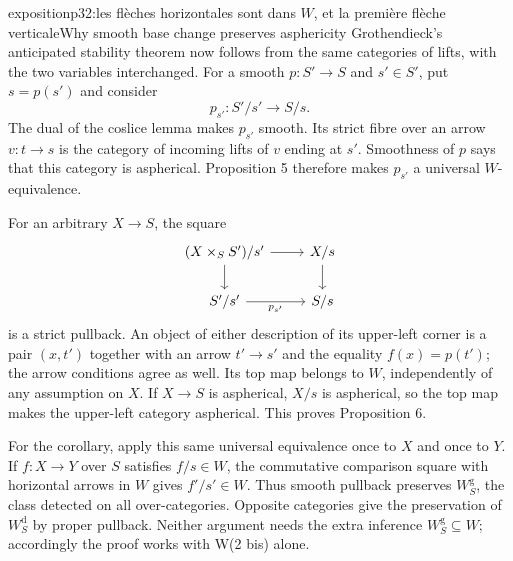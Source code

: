 \begin{dcomment}{exposition}{p32:les flèches horizontales sont dans $W$, et la première flèche verticale}{Why smooth base change preserves asphericity}
Grothendieck's anticipated stability theorem now follows from the same categories of lifts, with the two variables interchanged. For a smooth $p:S'\to S$ and $s'\in S'$, put $s=p(s')$ and consider
\[
 p_{s'}:S'/s'\longrightarrow S/s.
\]
The dual of the coslice lemma makes $p_{s'}$ smooth. Its strict fibre over an arrow $v:t\to s$ is the category of incoming lifts of $v$ ending at $s'$. Smoothness of $p$ says that this category is aspherical. Proposition 5 therefore makes $p_{s'}$ a universal $W$-equivalence.

For an arbitrary $X\to S$, the square
\[
\begin{tikzcd}
 (X\times_S S')/s'\ar[r]\ar[d]&X/s\ar[d]\\
 S'/s'\ar[r,"p_{s'}"']&S/s
\end{tikzcd}
\]
is a strict pullback. An object of either description of its upper-left corner is a pair $(x,t')$ together with an arrow $t'\to s'$ and the equality $f(x)=p(t')$; the arrow conditions agree as well. Its top map belongs to $W$, independently of any assumption on $X$. If $X\to S$ is aspherical, $X/s$ is aspherical, so the top map makes the upper-left category aspherical. This proves Proposition 6.

For the corollary, apply this same universal equivalence once to $X$ and once to $Y$. If $f:X\to Y$ over $S$ satisfies $f/s\in W$, the commutative comparison square with horizontal arrows in $W$ gives $f'/s'\in W$. Thus smooth pullback preserves $W_S^{\mathrm g}$, the class detected on all over-categories. Opposite categories give the preservation of $W_S^{\mathrm d}$ by proper pullback. Neither argument needs the extra inference $W_S^{\mathrm g}\subseteq W$; accordingly the proof works with W(2 bis) alone.
\end{dcomment}

